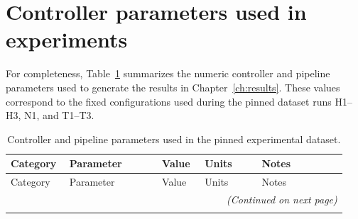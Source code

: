 \section{Controller parameters used in experiments}
For completeness, Table~\ref{tab:controller_params_overview} summarizes the numeric controller and pipeline parameters used to generate the results in Chapter~\ref{ch:results}. These values correspond to the fixed configurations used during the pinned dataset runs H1--H3, N1, and T1--T3.
\begingroup
\small
\setlength{\tabcolsep}{4pt}
\renewcommand{\arraystretch}{0.95}
\begin{longtable}{@{}p{0.16\linewidth}p{0.26\linewidth}p{0.12\linewidth}p{0.16\linewidth}p{0.24\linewidth}@{}}
  \caption{Controller and pipeline parameters used in the pinned experimental dataset.}
  \label{tab:controller_params_overview}\\
  \toprule
  Category & Parameter & Value & Units & Notes \\
  \midrule
  \endfirsthead
  \toprule
  Category & Parameter & Value & Units & Notes \\
  \midrule
  \endhead
  \midrule
  \multicolumn{5}{r}{\emph{(Continued on next page)}}\\
  \midrule
  \endfoot
  \bottomrule
  \endlastfoot


\end{longtable}
